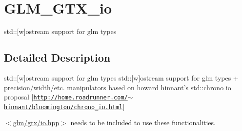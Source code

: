 \hypertarget{group__gtx__io}{\section{G\-L\-M\-\_\-\-G\-T\-X\-\_\-io}
\label{group__gtx__io}
}


std\-:\-:\mbox{[}w\mbox{]}ostream support for glm types  




\subsection{Detailed Description}
std\-:\-:\mbox{[}w\mbox{]}ostream support for glm types std\-:\-:\mbox{[}w\mbox{]}ostream support for glm types + precision/width/etc. manipulators based on howard hinnant's std\-::chrono io proposal \mbox{[}\href{http://home.roadrunner.com/~hinnant/bloomington/chrono_io.html}{\tt http\-://home.\-roadrunner.\-com/$\sim$hinnant/bloomington/chrono\-\_\-io.\-html}\mbox{]}

$<$\hyperlink{io_8hpp}{glm/gtx/io.\-hpp}$>$ needs to be included to use these functionalities. 